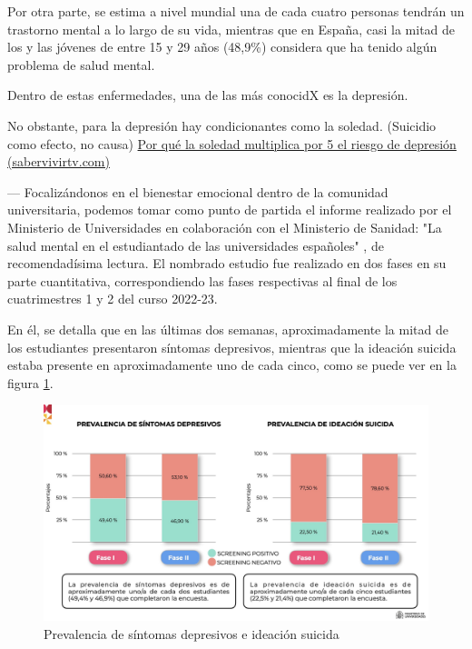 Por otra parte, se estima a nivel mundial una de cada cuatro personas tendrán un trastorno mental a lo largo de su vida, mientras que en España, casi la mitad de los y las jóvenes de entre 15 y 29 años (48,9\%) considera que ha tenido algún problema de salud mental.

Dentro de estas enfermedades, una de las más conocidX es la depresión.


No obstante, para la depresión hay condicionantes como la soledad. (Suicidio como efecto, no causa) \href{https://www.sabervivirtv.com/medicina-general/soledad-multiplica-riesgo-depresion_6528}{Por qué la soledad multiplica por 5 el riesgo de depresión (sabervivirtv.com)} 


---
Focalizándonos en el bienestar emocional dentro de la comunidad universitaria, podemos tomar como punto de partida el informe realizado por el Ministerio de Universidades en colaboración con el Ministerio de Sanidad: "La salud mental en el estudiantado de las universidades españoles" \cite{galache_gobierno_2023} \cite{ministerio_de_universidades_salud_2023}, de recomendadísima lectura. El nombrado estudio fue realizado en dos fases en su parte cuantitativa, correspondiendo las fases respectivas al final de los cuatrimestres 1 y 2 del curso 2022-23. 

En él, se detalla que en las últimas dos semanas, aproximadamente la mitad de los estudiantes presentaron síntomas depresivos, mientras que la ideación suicida estaba presente en aproximadamente uno de cada cinco, como se puede ver en la figura \ref{fig:intro:sintomas_depresivos_suicida}. 

\begin{figure}[h]
    \centering
    \includegraphics[width=0.75\linewidth]{figures/Sintomas depresion suicidio.jpg}
    \caption[Prevalencia de síntomas depresivos e ideación suicida]{Prevalencia de síntomas depresivos e ideación suicida \cite{ministerio_de_universidades_salud_2023}}
    \label{fig:intro:sintomas_depresivos_suicida}
\end{figure}

